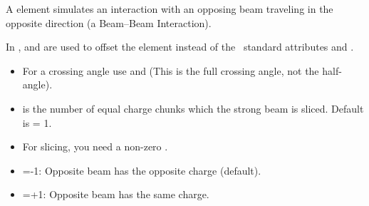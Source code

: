 A  element simulates an interaction with an opposing beam traveling in
the opposite direction (a Beam--Beam Interaction). 

\begin{table}[h]
\end{table}

In \bmad,  and  are used to offset the
 element instead of the \mad\ standard attributes
 and .
\begin{itemize}
\item For a crossing angle use  and  (This is the full crossing angle,
not the half-angle).
\item {} is the number of equal charge chunks which the strong beam is sliced.
      Default is  = 1.
\item For slicing, you need a non-zero .
\item {}=-1: Opposite beam has the opposite charge (default).
\item {}=+1: Opposite beam has the same charge.   
\end{itemize}

